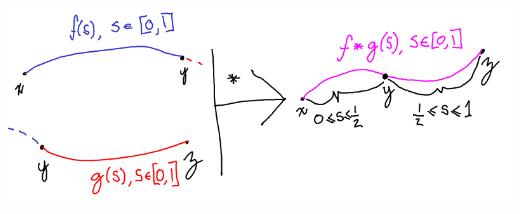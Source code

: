         \begin{minipage}[c]{\linewidth}
            \begin{center}
            \includegraphics[width=\linewidth]{images/concatenation.png}
            \end{center}
        \end{minipage}
